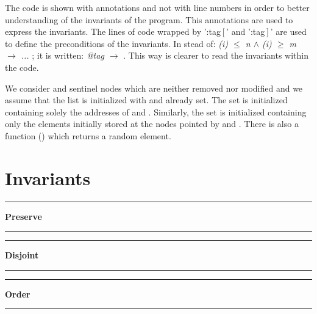 The code is shown with annotations and not with line numbers in order to better understanding of the invariants of the program.
%
This annotations are used to express the invariants. 
%
The lines of code wrapped by ':tag$\left[\right.$\;'  and ':tag$\left.\right]$\;' are used to define the preconditions of the invariants. 
%
In stead of: \textit{\pc(i) $\leq$ n $\wedge$ \pc(i) $\geq$ m  $\to$ ...} ; it is written: \textit{ @tag $\to$ }.
%
This way is clearer to read the invariants within the code.


We consider \head and \tail sentinel nodes which are neither removed nor 
modified and we assume that the list is initialized with \head and \tail 
already set.
%
The set \region is initialized containing solely the addresses of \head 
and \tail.
%
Similarly, the set \elements is initialized containing only the elements 
initially stored at the nodes pointed by \head and \tail.
%
There is also a function () which returns a random element. 



\chapter{Invariants}


\label{appendix::inv:full}



\begin{center}\rule{4cm}{0.4pt}  \textbf{Preserve}  \rule{4cm}{0.4pt}\end{center}
\label{inv::full:preserve}
\small{}

\normalsize{}


\begin{center}\rule{4cm}{0.4pt}  \textbf{Disjoint}  \rule{4cm}{0.4pt}\end{center}
\label{inv::full:disjoint}
\small{}

\normalsize{}


\begin{center}\rule{4cm}{0.4pt}  \textbf{Order}  \rule{4cm}{0.4pt}\end{center}
\label{inv::full:order}
\small{}

\normalsize{}



